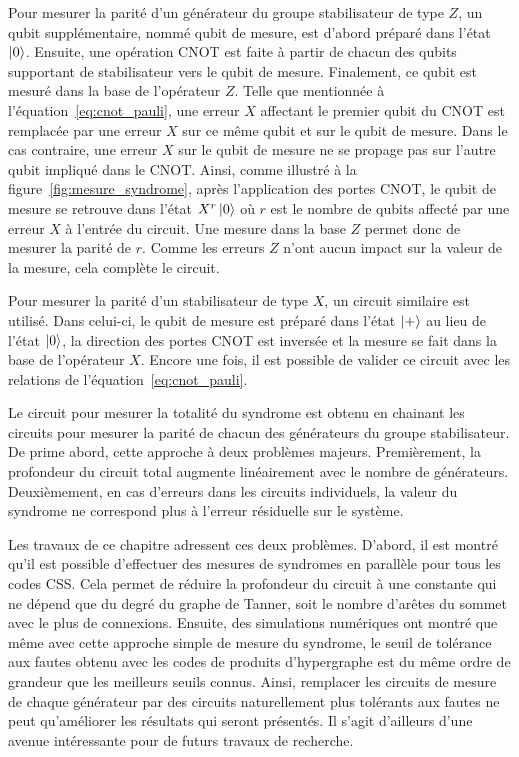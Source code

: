 Pour mesurer la parité d'un générateur du groupe stabilisateur de type $Z$,
un qubit supplémentaire, nommé qubit de mesure,
est d'abord préparé dans l'état $\ket 0$.
Ensuite,
une opération CNOT est faite à partir de chacun des qubits supportant de stabilisateur
vers le qubit de mesure.
Finalement,
ce qubit est mesuré dans la base de l'opérateur $Z$.
Telle que mentionnée à l'équation~\ref{eq:cnot_pauli},
une erreur $X$ affectant le premier qubit du CNOT est remplacée
par une erreur $X$ sur ce même qubit et sur le qubit de mesure.
Dans le cas contraire,
une erreur $X$ sur le qubit de mesure ne se propage pas sur l'autre qubit 
impliqué dans le CNOT.
Ainsi,
comme illustré à la figure~\ref{fig:mesure_syndrome},
après l'application des portes CNOT,
le qubit de mesure se retrouve dans l'état $X^r\ket{0}$ où 
$r$ est le nombre de qubits affecté par une erreur $X$ à l'entrée du circuit.
Une mesure dans la base $Z$ permet donc de mesurer la parité de $r$.
Comme les erreurs $Z$ n'ont aucun impact sur la valeur de la mesure,
cela complète le circuit.

Pour mesurer la parité d'un stabilisateur de type $X$,
un circuit similaire est utilisé.
Dans celui-ci,
le qubit de mesure est préparé dans l'état $\ket +$ au lieu de l'état $\ket 0$,
la direction des portes CNOT est inversée
et la mesure se fait dans la base de l'opérateur $X$.
Encore une fois,
il est possible de valider ce circuit avec les relations de l'équation~\ref{eq:cnot_pauli}.

Le circuit pour mesurer la totalité du syndrome est obtenu 
en chainant les circuits pour mesurer la parité de chacun des
générateurs du groupe stabilisateur.
De prime abord,
cette approche à deux problèmes majeurs.
Premièrement,
la profondeur du circuit total augmente linéairement avec le nombre 
de générateurs.
Deuxièmement,
en cas d'erreurs dans les circuits individuels,
la valeur du syndrome ne correspond plus à l'erreur résiduelle sur le système.

Les travaux de ce chapitre adressent ces deux problèmes.
D'abord,
il est montré qu'il est possible d'effectuer des mesures de syndromes en parallèle
pour tous les codes CSS.
Cela permet de réduire la profondeur du circuit à une constante qui ne dépend que
du degré du graphe de Tanner,
soit le nombre d'arêtes du sommet avec le plus de connexions.
Ensuite,
des simulations numériques ont montré que même avec cette approche simple
de mesure du syndrome,
le seuil de tolérance aux fautes obtenu avec les codes de produits d'hypergraphe
est du même ordre de grandeur que les meilleurs seuils connus.
Ainsi,
remplacer les circuits de mesure de chaque générateur par des circuits
naturellement plus tolérants aux fautes ne peut qu'améliorer les résultats qui seront présentés.
Il s'agit d'ailleurs d'une avenue intéressante pour de futurs travaux de recherche.

